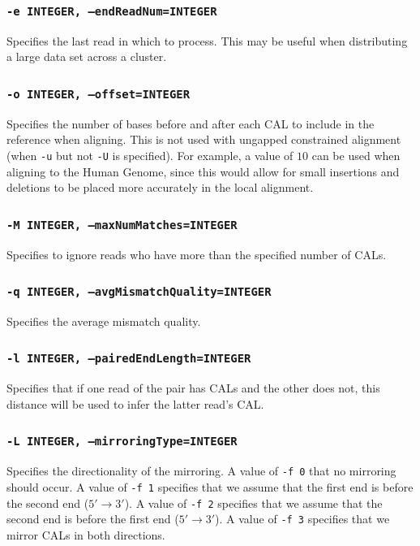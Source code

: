 \documentclass[a4paper,12pt]{book}
\newcommand{\TT}[1]{{\tt #1}} %
\begin{document}
\subsubsection{\TT{-e INTEGER, --endReadNum=INTEGER}}
Specifies the last read in which to process.
This may be useful when distributing a large data set across a cluster.

\subsubsection{\TT{-o INTEGER, --offset=INTEGER}}
Specifies the number of bases before and after each CAL to include in the reference when aligning.  
This is not used with ungapped constrained alignment (when \TT{-u} but not \TT{-U} is specified).
For example, a value of $10$ can be used when aligning to the Human Genome, since this would allow for small insertions and deletions to be placed more accurately in the local alignment.

\subsubsection{\TT{-M INTEGER, --maxNumMatches=INTEGER}}
Specifies to ignore reads who have more than the specified number of CALs.


\subsubsection{\TT{-q INTEGER, --avgMismatchQuality=INTEGER}}
Specifies the average mismatch quality.

\subsubsection{\TT{-l INTEGER, --pairedEndLength=INTEGER}}
Specifies that if one read of the pair has CALs and the other does not, this distance will be used to infer the latter read’s CAL.

\subsubsection{\TT{-L INTEGER, --mirroringType=INTEGER}}
Specifies the directionality of the mirroring.
A value of \TT{-f 0} that no mirroring should occur.
A value of \TT{-f 1} specifies that we assume that the first end is before the second end ($5'\rightarrow3'$).
A value of \TT{-f 2} specifies that we assume that the second end is before the first end ($5'\rightarrow3'$).
A value of \TT{-f 3} specifies that we mirror CALs in both directions.
\end{document}
